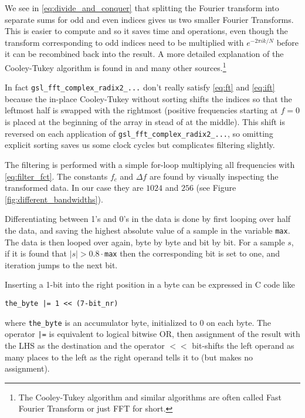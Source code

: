 \documentclass[12pt,a4paper]{article}
\begin{document}
We see in \eqref{eq:divide_and_conquer} that splitting the Fourier transform into
separate sums for odd and even indices gives us two smaller Fourier Transforms.
This is easier to compute and so it saves time and operations, even though the transform corresponding to odd indices need
to be multiplied with $e^{-2\pi ik/N}$ before it can be recombined back into the result.
A more detailed explanation of the Cooley-Tukey algorithm is found in \cite{paper}
and many other sources.\footnote{The Cooley-Tukey algorithm and similar algorithms
are often called Fast Fourier Transform or just FFT for short.}

In fact \texttt{gsl\_fft\_complex\_radix2\_...} don't really satisfy \eqref{eq:ft} and \eqref{eq:ift}
because the in-place Cooley-Tukey without sorting shifts the indices
so that the leftmost half is swapped with the rightmost (positive frequencies
starting at $f=0$ is placed at the beginning of the array in stead of at the middle).
This shift is reversed on each application of \texttt{gsl\_fft\_complex\_radix2\_...}, so omitting explicit
sorting saves us some clock cycles but complicates filtering slightly.

The filtering is performed with a simple for-loop
multiplying all frequencies with \eqref{eq:filter_fct}.
The constants $f_c$ and $\Delta f$ are found by visually inspecting the transformed data.
In our case they are $1024$ and $256$ (see Figure \ref{fig:different_bandwidths}).

Differentiating between 1's and 0's in the data is done by first looping
over half the data, and saving the highest absolute value of a sample in
the variable \texttt{max}. The data is then looped over again, byte by byte
and bit by bit. For a sample $s$, if it is found that $|s|>0.8\cdot$\texttt{max}
then the corresponding bit is set to one, and iteration jumps to the
next bit.

Inserting a 1-bit into the right position in a byte can be expressed in C code like
\begin{verbatim}
the_byte |= 1 << (7-bit_nr)
\end{verbatim}
where \texttt{the\_byte} is an accumulator byte, initialized to 0 on each byte. The operator \texttt{|=}
is equivalent to logical bitwise OR, then assignment of the result with the LHS as the destination
and the operator $\mathtt{<<}$ bit-shifts the left operand as many places to the left as the right operand
tells it to (but makes no assignment).
\end{document}
